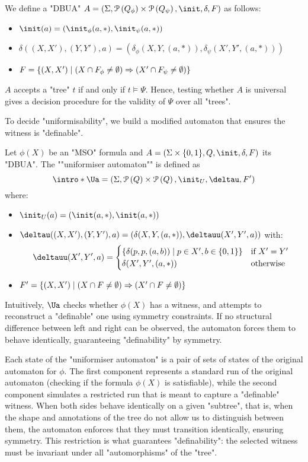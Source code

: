 \documentclass[a4paper,UKenglish,cleveref, autoref, thm-restate]{lipics-v2021}
\begin{document}
We define a "DBUA" $A = (\Sigma, \parts{Q_\phi} \times \parts{Q_\psi}, \init, \delta, F)$ as follows:
\begin{itemize}
	\item $\init(a) = (\init_\phi(a,*), \init_\psi(a,*))$
	\item $\delta((X,X'),(Y,Y'),a) = (\delta_\phi(X,Y,(a,*)), \delta_\psi(X',Y',(a,*)))$
	\item $F = \left\{(X,X') \mid (X \cap F_\phi \neq \emptyset) \Rightarrow (X' \cap F_\psi \neq \emptyset)\right\}$
\end{itemize}

$A$ accepts a "tree" $t$ if and only if $t \models \Psi$. Hence, testing whether $A$ is universal gives a decision procedure for the validity of $\Psi$ over all "trees".

To decide "uniformisability", we build a modified automaton that ensures the witness is "definable".

\begin{definition}
	\AP Let $\phi(X)$ be an "MSO" formula and $A = (\Sigma \times \{0,1\}, Q, \init, \delta, F)$ its "DBUA". The ""uniformiser automaton"" is defined as
	\[
		\intro* \Ua = (\Sigma, \parts{Q} \times \parts{Q}, \init_U, \deltau, F')
	\]
	where:
	\begin{itemize}
		\item $\init_U(a) = (\init(a,*), \init(a,*))$
		\item $\deltau((X,X'),(Y,Y'),a) = (\delta(X,Y,(a,*)), \deltauu(X',Y',a))$ with:
		      \[
			      \deltauu(X',Y',a) = \begin{cases}
				      \setdef{\delta(p,p,(a,b))}{p \in X', b \in \set{0,1}} & \text{if } X' = Y' \\
				      \delta(X',Y',(a,*))                                   & \text{otherwise}
			      \end{cases}
		      \]
		\item $F' = \left\{(X,X') \mid (X \cap F \neq \emptyset) \Rightarrow (X' \cap F \neq \emptyset)\right\}$
	\end{itemize}
\end{definition}


Intuitively, $\Ua$ checks whether $\phi(X)$ has a witness, and attempts to reconstruct a "definable" one using symmetry constraints.
If no structural difference between left and right can be observed, the automaton forces them to behave identically, guaranteeing
"definability" by symmetry.

Each state of the "uniformiser automaton" is a pair of sets of states of the original automaton for $\phi$.
The first component represents a standard run of the original automaton (checking if the formula $\phi(X)$
is satisfiable), while the second component simulates a restricted run that is meant to capture a "definable" witness.
When both sides behave identically on a given "subtree", that is, when the shape and annotations of the tree do not allow
us to distinguish between them, the automaton enforces that they must transition identically, ensuring symmetry. This restriction
is what guarantees "definability": the selected witness must be invariant under all "automorphisms" of the "tree".
\end{document}

